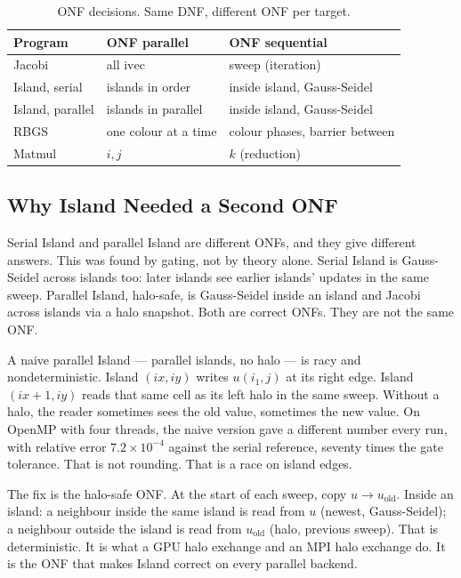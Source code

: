 \documentclass[11pt]{article}
\begin{document}
\begin{table}[h]
\centering
\small
\begin{tabular}{lll}
\toprule
Program & ONF parallel & ONF sequential \\
\midrule
Jacobi & all $\mathrm{ivec}$ & sweep (iteration) \\
Island, serial & islands in order & inside island, Gauss-Seidel \\
Island, parallel & islands in parallel & inside island, Gauss-Seidel \\
RBGS & one colour at a time & colour phases, barrier between \\
Matmul & $i,j$ & $k$ (reduction) \\
\bottomrule
\end{tabular}
\caption{ONF decisions. Same DNF, different ONF per target.}
\label{tab:onf}
\end{table}

\subsection{Why Island Needed a Second ONF}
Serial Island and parallel Island are different ONFs, and they give
different answers. This was found by gating, not by theory alone.
Serial Island is Gauss-Seidel across islands too: later islands see earlier
islands' updates in the same sweep. Parallel Island, halo-safe, is
Gauss-Seidel inside an island and Jacobi across islands via a halo snapshot.
Both are correct ONFs. They are not the same ONF.

A naive parallel Island --- parallel islands, no halo --- is racy and
nondeterministic. Island $(ix,iy)$ writes $u(i_1,j)$ at its right edge.
Island $(ix+1,iy)$ reads that same cell as its left halo in the same sweep.
Without a halo, the reader sometimes sees the old value, sometimes the new
value. On OpenMP with four threads, the naive version gave a different
number every run, with relative error $7.2 \times 10^{-4}$ against the
serial reference, seventy times the gate tolerance. That is not rounding.
That is a race on island edges.

The fix is the halo-safe ONF. At the start of each sweep, copy $u \to u_{\mathrm{old}}$.
Inside an island: a neighbour inside the same island is read from $u$
(newest, Gauss-Seidel); a neighbour outside the island is read from
$u_{\mathrm{old}}$ (halo, previous sweep). That is deterministic. It is what
a GPU halo exchange and an MPI halo exchange do. It is the ONF that makes
Island correct on every parallel backend.
\end{document}
